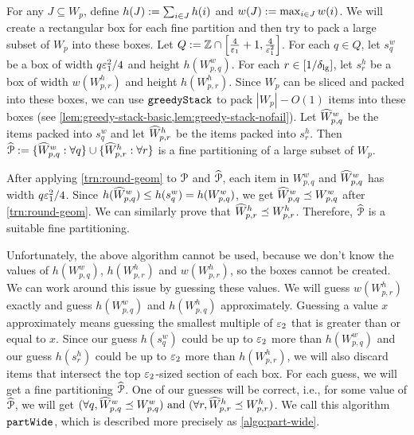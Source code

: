 For any $J \subseteq W_p$, define
$h(J) := \sum_{i \in J} h(i)$ and $w(J) := \max_{i \in J} w(i)$.
We will create a rectangular box for each fine partition
and then try to pack a large subset of $W_p$ into these boxes.
Let $Q := \mathbb{Z} \cap \left[\frac{4}{\varepsilon_1}+1, \frac{4}{\varepsilon_1^2}\right]$.
For each $q \in Q$, let $s^w_q$ be a box
of width $q\varepsilon_1^2/4$ and height $h(W^w_{p,q})$.
For each $r \in [1/\delta_{\mathrm{lg}}]$, let $s^h_r$ be a box
of width $w(W^h_{p,r})$ and height $h(W^h_{p,r})$.
Since $W_p$ can be sliced and packed into these boxes,
we can use $\operatorname{\mathtt{greedyStack}}$ to pack $|W_p| - O(1)$ items into these boxes
(see \cref{lem:greedy-stack-basic,lem:greedy-stack-nofail}).
Let $\widehat{W}^w_{p,q}$ be the items packed into $s^w_q$ and
let $\widehat{W}^h_{p,r}$ be the items packed into $s^h_r$.
Then $\widehat{\mathcal{P}} := \{\widehat{W}_{p,q}^w: \forall q\} \cup \{\widehat{W}_{p,r}^h: \forall r\}$
is a fine partitioning of a large subset of $W_p$.

After applying \cref{trn:round-geom} to $\mathcal{P}$ and $\widehat{\mathcal{P}}$,
each item in $W^w_{p,q}$ and $\widehat{W}^w_{p,q}$ has width $q\varepsilon_1^2/4$.
Since $h(\widehat{W}^w_{p,q}) \le h(s^w_q) = h(W^w_{p,q})$,
we get $\widehat{W}^w_{p,q} \preceq W^w_{p,q}$ after \cref{trn:round-geom}.
We can similarly prove that $\widehat{W}^h_{p,r} \preceq W^h_{p,r}$.
Therefore, $\widehat{\mathcal{P}}$ is a suitable fine partitioning.

Unfortunately, the above algorithm cannot be used, because we don't know the values of
$h(W^w_{p,q})$, $h(W^h_{p,r})$ and $w(W^h_{p,r})$, so the boxes cannot be created.
We can work around this issue by guessing these values.
We will guess $w(W^h_{p,r})$ exactly and
guess $h(W^w_{p,q})$ and $h(W^h_{p,q})$ approximately.
Guessing a value $x$ approximately means guessing the smallest multiple of $\varepsilon_2$
that is greater than or equal to $x$.
Since our guess $h(s^w_q)$ could be up to $\varepsilon_2$ more than $h(W^w_{p,q})$
and our guess $h(s^h_r)$ could be up to $\varepsilon_2$ more than $h(W^h_{p,r})$,
we will also discard items that intersect the top $\varepsilon_2$-sized section of each box.
For each guess, we will get a fine partitioning $\widehat{\mathcal{P}}$.
One of our guesses will be correct, i.e., for some value of $\widehat{\mathcal{P}}$, we will get
$(\forall q, \widehat{W}^w_{p,q} \preceq W^w_{p,q})
\textrm{ and } (\forall r, \widehat{W}^h_{p,r} \preceq W^h_{p,r})$.
We call this algorithm $\operatorname{\mathtt{partWide}}$, which is described more precisely as \cref{algo:part-wide}.


